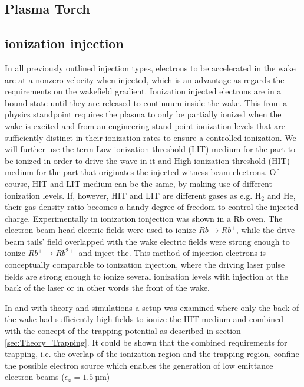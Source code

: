 \subsection{Plasma Torch}
\cite{PlaTo,PlaTo2}
\subsection{ionization injection}
In all previously outlined injection types, electrons to be accelerated in the wake are at a nonzero velocity when injected, which is an advantage as regards the requirements on the wakefield gradient. Ionization injected electrons are in a bound state until they are released to continuum inside the wake. This from a physics standpoint requires the plasma to only be partially ionized when the wake is excited and from an engineering stand point ionization levels that are sufficiently distinct in their ionization rates to ensure a controlled ionization. We will further use the term Low ionization threshold (LIT) medium for the part to be ionized in order to drive the wave in it and High ionization threshold (HIT) medium for the part that originates the injected witness beam electrons. Of course, HIT and LIT medium can be the same, by making use of different ionization levels. If, however, HIT and LIT are different gases as e.g. H$_2$ and He, their gas density ratio becomes a handy degree of freedom to control the injected charge.
Experimentally in \cite{Navid_distributed_PRL} ionization ionjection was shown in a Rb oven. The electron beam head electric fields were used to ionize $Rb\rightarrow Rb^+$, while the drive beam tails' field overlapped with the wake electric fields were strong enough to ionize $Rb^+ \rightarrow Rb^{2+}$ and inject the. This method of injection electrons is conceptually comparable to ionization injection, where the driving laser pulse fields are strong enough to ionize several ionization levels with injection at the back of the laser or in other words the front of the wake\cite{Pak_Ion_InjectionPRL2010}.

In \cite{Ossa_Rake_PRL2013} and \cite{MartinezdelaOssa2014231} with theory and simulations a setup was examined where only the back of the wake had sufficiently high fields to ionize the HIT medium and combined with the concept of the trapping potential as described in section \ref{sec:Theory_Trapping}. It could be shown that the combined requirements for trapping, i.e. the overlap of the ionization region and the trapping region, confine the possible electron source which enables the generation of low emittance electron beams ($\epsilon_x=1.5\ \mathrm{µm}$) 




